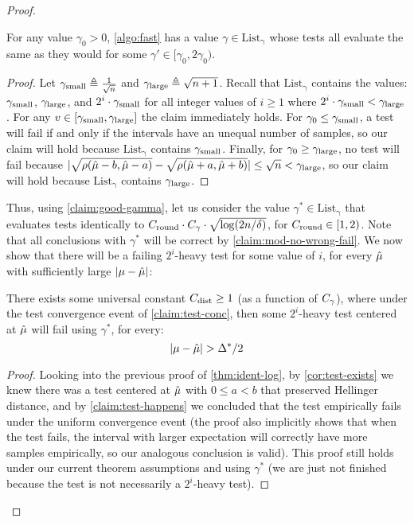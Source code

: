 \begin{proof}
    \begin{claim}\label{claim:good-gamma}
        For any value $\gamma_0>0$, \cref{algo:fast} has a value $\gamma \in \operatorname{List_\gamma}$ whose tests all evaluate the same as they would for some $\gamma' \in [\gamma_0,2\gamma_0)$.
    \end{claim}
    \begin{proof}
        Let $\gamma_{\textrm{small}} \triangleq \tfrac{1}{\sqrt{n}}$ and $\gamma_{\textrm{large}} \triangleq \sqrt{n+1}$. Recall that $\operatorname{List_\gamma}$ contains the values: $\gamma_{\textrm{small}}$, $\gamma_{\textrm{large}}$, and $2^i \cdot \gamma_{\textrm{small}}$ for all integer values of $i\ge 1$ where $2^i \cdot \gamma_{\textrm{small}} < \gamma_{\textrm{large}}$. For any $v \in [\gamma_{\textrm{small}},\gamma_{\textrm{large}}]$ the claim immediately holds. For $\gamma_0 \le \gamma_{\textrm{small}}$, a test will fail if and only if the intervals have an unequal number of samples, so our claim will hold because $\operatorname{List_\gamma}$ contains $ \gamma_{\textrm{small}}$. Finally, for $\gamma_0 \ge \gamma_{\textrm{large}}$, no test will fail because $|\sqrt{\rho(\hat{\mu}-b,\hat{\mu}-a)}-\sqrt{\rho(\hat{\mu}+a,\hat{\mu}+b)}| \le \sqrt{n} < \gamma_{\textrm{large}}$, so our claim will hold because $\operatorname{List_\gamma}$ contains $\gamma_{\textrm{large}}$.
    \end{proof}

    Thus, using \cref{claim:good-gamma}, let us consider the value $\gamma^* \in \operatorname{List_\gamma}$ that evaluates tests identically to $C_{\operatorname{round}} \cdot C_{\gamma} \cdot \sqrt{\log(2n/\delta)}$, for $C_{\operatorname{round}} \in [1,2)$. Note that all conclusions with $\gamma^*$ will be correct by \cref{claim:mod-no-wrong-fail}. We now show that there will be a failing $2^i$-heavy test for some value of $i$, for every $\hat{\mu}$ with sufficiently large $|\mu - \hat{\mu}|$:

    \begin{lemma}\label{claim:structure-test-happens}
        There exists some universal constant $C_{\operatorname{dist}} \ge 1$ (as a function of $C_{\gamma}$), where under the test convergence event of \cref{claim:test-conc}, then some $2^i$-heavy test centered at $\hat{\mu}$ will fail using $\gamma^*$, for every:
        \begin{equation*}
            |\mu - \hat{\mu}| > \Delta^*/2
        \end{equation*}
    \end{lemma}
    \begin{proof}
        Looking into the previous proof of \cref{thm:ident-log}, by \cref{cor:test-exists} we knew there was a test centered at $\hat{\mu}$ with $0 \le a < b$ that preserved Hellinger distance, and by \cref{claim:test-happens} we concluded that the test empirically fails under the uniform convergence event (the proof also implicitly shows that when the test fails, the interval with larger expectation will correctly have more samples empirically, so our analogous conclusion is valid). This proof still holds under our current theorem assumptions and using $\gamma^*$ (we are just not finished because the test is not necessarily a $2^i$-heavy test). 
        

\end{proof}
\end{proof}

